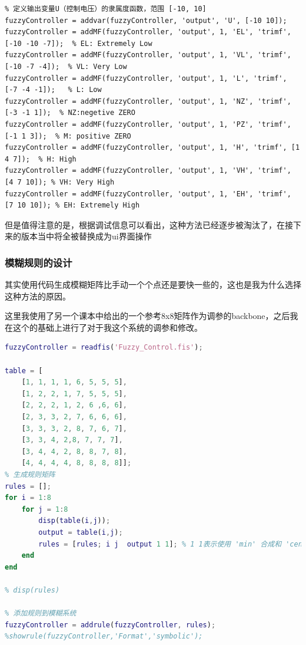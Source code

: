 \documentclass[12pt,a4paper,UTF8]{article}
\begin{document}
\begin{lstlisting}
% 定义输出变量U（控制电压）的隶属度函数，范围 [-10, 10]
fuzzyController = addvar(fuzzyController, 'output', 'U', [-10 10]);
fuzzyController = addMF(fuzzyController, 'output', 1, 'EL', 'trimf', [-10 -10 -7]);  % EL: Extremely Low
fuzzyController = addMF(fuzzyController, 'output', 1, 'VL', 'trimf', [-10 -7 -4]);  % VL: Very Low
fuzzyController = addMF(fuzzyController, 'output', 1, 'L', 'trimf', [-7 -4 -1]);   % L: Low
fuzzyController = addMF(fuzzyController, 'output', 1, 'NZ', 'trimf', [-3 -1 1]);  % NZ:negetive ZERO
fuzzyController = addMF(fuzzyController, 'output', 1, 'PZ', 'trimf', [-1 1 3]);  % M: positive ZERO
fuzzyController = addMF(fuzzyController, 'output', 1, 'H', 'trimf', [1 4 7]);  % H: High
fuzzyController = addMF(fuzzyController, 'output', 1, 'VH', 'trimf', [4 7 10]); % VH: Very High
fuzzyController = addMF(fuzzyController, 'output', 1, 'EH', 'trimf', [7 10 10]); % EH: Extremely High
\end{lstlisting}

但是值得注意的是，根据调试信息可以看出，这种方法已经逐步被淘汰了，在接下来的版本当中将全被替换成为ui界面操作

\subsubsection{模糊规则的设计}
其实使用代码生成模糊矩阵比手动一个个点还是要快一些的，这也是我为什么选择这种方法的原因。


这里我使用了另一个课本中给出的一个参考8x8矩阵作为调参的backbone，之后我在这个的基础上进行了对于我这个系统的调参和修改。


\begin{lstlisting}[language=Matlab,caption=生成规则矩阵]
fuzzyController = readfis('Fuzzy_Control.fis');

table = [
    [1, 1, 1, 1, 6, 5, 5, 5],
    [1, 2, 2, 1, 7, 5, 5, 5],
    [2, 2, 2, 1, 2, 6 ,6, 6],
    [2, 3, 3, 2, 7, 6, 6, 6],
    [3, 3, 3, 2, 8, 7, 6, 7],
    [3, 3, 4, 2,8, 7, 7, 7],
    [3, 4, 4, 2, 8, 8, 7, 8],
    [4, 4, 4, 4, 8, 8, 8, 8]];
% 生成规则矩阵
rules = [];
for i = 1:8
    for j = 1:8
        disp(table(i,j));
        output = table(i,j);
        rules = [rules; i j  output 1 1]; % 1 1表示使用 'min' 合成和 'centroid' 解模糊
    end
end

% disp(rules)

% 添加规则到模糊系统
fuzzyController = addrule(fuzzyController, rules);
%showrule(fuzzyController,'Format','symbolic');
\end{lstlisting}
\end{document}
